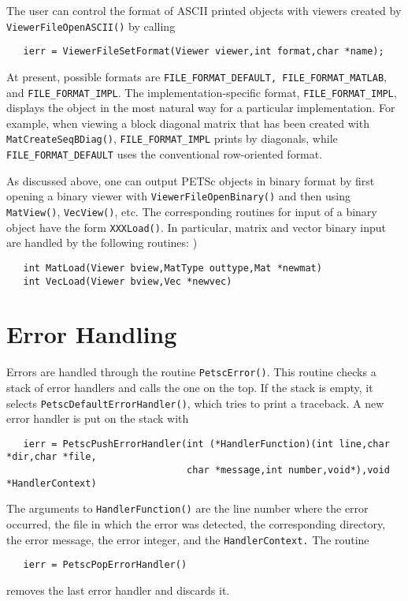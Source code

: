 The user can control the format of ASCII printed objects with viewers 
created by {\tt ViewerFileOpenASCII()} by calling
\begin{verbatim}
   ierr = ViewerFileSetFormat(Viewer viewer,int format,char *name);
\end{verbatim}  
At present, possible formats are 
  
{\tt FILE\_FORMAT\_DEFAULT, FILE\_FORMAT\_MATLAB}, and 
{\tt FILE\_FORMAT\_IMPL}.  The implementation-specific format, 
{\tt FILE\_FORMAT\_IMPL}, displays the object in the most natural way
for a particular implementation.  For example, when viewing a block 
diagonal matrix that has been created with {\tt MatCreateSeqBDiag()},
{\tt FILE\_FORMAT\_IMPL} prints by diagonals, while {\tt FILE\_FORMAT\_DEFAULT}
uses the conventional row-oriented format.

As discussed above, one can output PETSc objects in binary format by
first opening a binary viewer with {\tt ViewerFileOpenBinary()} and
then using {\tt MatView()}, {\tt VecView()}, etc.  The corresponding
routines for input of a binary object have the form {\tt XXXLoad()}.  In
particular, matrix and vector binary input are handled by the
following routines:  )
\begin{verbatim}
   int MatLoad(Viewer bview,MatType outtype,Mat *newmat)
   int VecLoad(Viewer bview,Vec *newvec)
\end{verbatim}

\section{Error Handling}   

Errors are handled through the routine {\tt PetscError()}. 
 This routine
checks a stack of error handlers and calls the one on the top.  
If the stack is empty, it selects {\tt PetscDefaultErrorHandler()}, 
which  tries to print a traceback. 
A new error handler is put on the stack with
\begin{verbatim}
   ierr = PetscPushErrorHandler(int (*HandlerFunction)(int line,char *dir,char *file,
                                char *message,int number,void*),void *HandlerContext)
\end{verbatim}
The arguments to {\tt HandlerFunction()} are the line number where 
the error occurred, the file in which the error was detected, the corresponding
directory, the error message, the error integer, and the {\tt HandlerContext.}
The routine 
\begin{verbatim} 
   ierr = PetscPopErrorHandler()
\end{verbatim}
removes the last error handler and discards it. 

